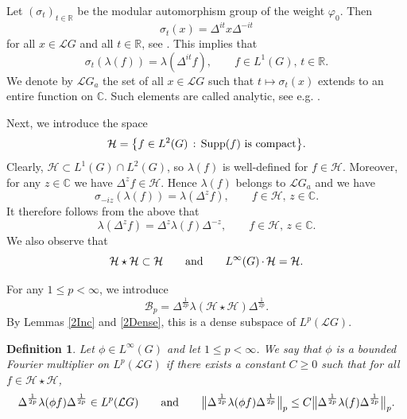 \documentclass[12pt]{amsart}
\newcommand{\Cdb}{\mbox{$\mathbb{C}$}}
\newcommand{\Rdb}{\mbox{$\mathbb{R}$}}
\renewcommand{\H}{\mbox{${\mathcal H}$}}
\newcommand{\bignorm}[1]{\bigl\Vert#1\bigr\Vert}
\newtheorem{definition}[theorem]{Definition}
\theoremstyle{remark}
\theoremstyle{definition}
\numberwithin{equation}{section}
\begin{document}
Let $(\sigma_t)_{t\in{\mathbb R}}$ be the modular 
automorphism group of the weight  $\varphi_0$. 
Then 
$$
\sigma_t(x) = \Delta^{it}x\Delta^{-it}
$$
for all $x\in{\mathcal L}G$ and all $t\in\Rdb$, see \cite[Section 2]{Haag}.
This implies that
$$
\sigma_t(\lambda(f)) =\lambda(\Delta^{it}f),\qquad f\in L^1(G),\, t\in\Rdb.
$$
We denote by ${\mathcal L}G_a$ the set of all $x\in{\mathcal L}G$ such that $t\mapsto\sigma_t(x)$
extends to an entire function on $\Cdb$.
Such elements are called analytic, see e.g. \cite[Section VIII.2]{Tak2}.





Next, we introduce the space
$$
\H= \bigl\{f\in L^2(G)\, :\, {\rm Supp}(f)\ \hbox{is compact}\bigr\}.
$$
Clearly, $\H\subset L^1(G)\cap L^2(G)$, so $\lambda(f)$ is well-defined 
for $f\in\H$.
Moreover, for any 
$z\in\Cdb$ we have $\Delta^{z}f\in\H$. Hence $\lambda(f)$ 
belongs to ${\mathcal L}G_a$ and we have
$$
\sigma_{-iz}(\lambda(f)) = \lambda(\Delta^{z}f),\qquad f\in\H,\, z\in\Cdb.
$$
It therefore follows from the above that
\begin{equation}\label{3Comm}
\lambda(\Delta^z f) = \Delta^z\lambda(f)\Delta^{-z},\qquad f\in\H,\, z\in\Cdb.
\end{equation}
We also observe that
\begin{equation}\label{3HH}
\H\star\H\subset\H
\qquad\hbox{and}\qquad 
L^\infty(G)\,\cdotp \H=\H.
\end{equation}













For any $1\leq p<\infty$, we introduce
$$
{\mathcal B}_p = \Delta^{\frac{1}{2p}} \lambda(\H\star \H) \Delta^{\frac{1}{2p}}.
$$
By Lemmas \ref{2Inc} and \ref{2Dense}, this is a dense subspace of $L^p({\mathcal L}G)$. 



\begin{definition}\label{3BFM} 
Let $\phi\in L^\infty(G)$ and let $1\leq p<\infty$. We say that $\phi$ is a bounded Fourier multiplier 
on $L^p({\mathcal L}G)$ if there exists a constant $C\geq 0$ such that
for all $f\in\H\star\H$,
$$
\Delta^{\frac{1}{2p}} \lambda(\phi f) \Delta^{\frac{1}{2p}} \in L^p({\mathcal L}G)
\qquad\hbox{and}\qquad
\bignorm{\Delta^{\frac{1}{2p}} \lambda(\phi f) \Delta^{\frac{1}{2p}}}_p\leq 
C\bignorm{\Delta^{\frac{1}{2p}} \lambda(f) \Delta^{\frac{1}{2p}}}_p.
$$
\end{definition}
\end{document}
